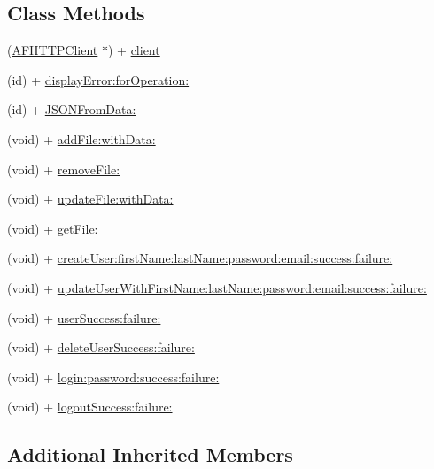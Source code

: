 \subsection*{Class Methods}
\begin{DoxyCompactItemize}
\item 
(\hyperlink{interface_a_f_h_t_t_p_client}{A\-F\-H\-T\-T\-P\-Client} $\ast$) + \hyperlink{interface_w_request_aeb64be717a74de162b4504b3fcd2ec54}{client}
\item 
(id) + \hyperlink{interface_w_request_a9357742571c1ca423c27d4ceef2ef0e4}{display\-Error\-:for\-Operation\-:}
\item 
(id) + \hyperlink{interface_w_request_ab46d7c29a0c52a7d305c0965eb6d82ea}{J\-S\-O\-N\-From\-Data\-:}
\item 
(void) + \hyperlink{interface_w_request_aba737df426a4c675193abeef2f8aca91}{add\-File\-:with\-Data\-:}
\item 
(void) + \hyperlink{interface_w_request_a273228af7e52c73d0201e3a9fb161b76}{remove\-File\-:}
\item 
(void) + \hyperlink{interface_w_request_a5a9316b6ca67b92fffca5e47d283fc49}{update\-File\-:with\-Data\-:}
\item 
(void) + \hyperlink{interface_w_request_acf1a3b70bd96ea54cc9db905bbbc4c2e}{get\-File\-:}
\item 
(void) + \hyperlink{interface_w_request_a676c38fde57d2f6d6d75927f220e9f4f}{create\-User\-:first\-Name\-:last\-Name\-:password\-:email\-:success\-:failure\-:}
\item 
(void) + \hyperlink{interface_w_request_ae384a94e5842dcc05d87a35c7d485bc1}{update\-User\-With\-First\-Name\-:last\-Name\-:password\-:email\-:success\-:failure\-:}
\item 
(void) + \hyperlink{interface_w_request_ad4e64a826bae67b6d8ae922583a9f781}{user\-Success\-:failure\-:}
\item 
(void) + \hyperlink{interface_w_request_a852fffeb2c740551c1d07be57b6729e4}{delete\-User\-Success\-:failure\-:}
\item 
(void) + \hyperlink{interface_w_request_aef5a097ed530f9aa8e56d8d26a4e958e}{login\-:password\-:success\-:failure\-:}
\item 
(void) + \hyperlink{interface_w_request_a67f15d943515e3ff89ccf20ccd49ee5a}{logout\-Success\-:failure\-:}
\end{DoxyCompactItemize}
\subsection*{Additional Inherited Members}


